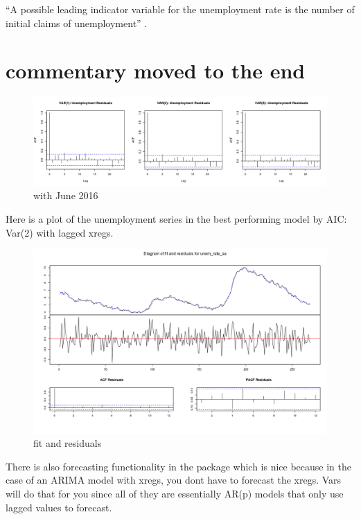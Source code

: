 \documentclass[twoside,twocolumn]{article}
\begin{document}
``A possible leading indicator variable for the unemployment rate is the number of initial claims of unemployment'' \citep{Montgomery1998}.

\section{commentary moved to the end}

  \begin{figure}[htb]
    	\centering
     	\caption{with June 2016}
     	\includegraphics[width=\linewidth]{images/varUnemresid}
 \end{figure}
 
 Here is a plot of the unemployment series in the best performing model by AIC: Var(2) with lagged xregs.
 
   \begin{figure}[htb]
    	\centering
     	\caption{fit and residuals}
     	\includegraphics[width=\linewidth]{images/unem_rate_fit_resid}
 \end{figure}
 
 There is also forecasting functionality in the package which is nice because in the case of an ARIMA model with xregs, you dont have to forecast the xregs. Vars will do that for you since all of they are essentially AR(p) models that only use lagged values to forecast.
 
\end{document}
